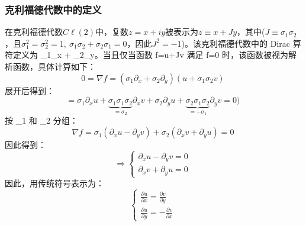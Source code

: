 \subsubsection{克利福德代数中的定义}  
在克利福德代数\({\displaystyle C\ell (2)}\)中，复数\({\displaystyle z=x+iy}\)被表示为\({\displaystyle z\equiv x+Jy}\)，其中(\({\displaystyle J\equiv \sigma_1\sigma_2}\)，且\({\displaystyle \sigma_1^2=\sigma_2^2=1,\ \sigma_1\sigma_2+\sigma_2\sigma_1=0}\)，因此\({\displaystyle J^2=-1}\))。该克利福德代数中的 Dirac 算符定义为 {\displaystyle \nabla \equiv \sigma_1\partial_x + \sigma_2\partial_y}。当且仅当函数 {\displaystyle f=u+Jv} 满足 {\displaystyle \nabla f=0} 时，该函数被视为解析函数，具体计算如下：
\[
0 = \nabla f = (\sigma_1 \partial_x + \sigma_2 \partial_y)(u + \sigma_1\sigma_2 v)~
\]
展开后得到：
\[
= \sigma_1 \partial_x u + \underbrace{\sigma_1 \sigma_1 \sigma_2}_{=\sigma_2} \partial_x v + \sigma_2 \partial_y u + \underbrace{\sigma_2 \sigma_1 \sigma_2}_{=-\sigma_1} \partial_y v = 0)~
\]
按 {\displaystyle \sigma_1} 和 {\displaystyle \sigma_2} 分组：
\[
\nabla f = \sigma_1 (\partial_x u - \partial_y v) + \sigma_2 (\partial_x v + \partial_y u) = 0~
\]
因此得到：
\[
\Rightarrow \begin{cases} \partial_x u - \partial_y v = 0 \\ \partial_x v + \partial_y u = 0 \end{cases}~
\]
因此，用传统符号表示为：
\[
\begin{cases} \frac{\partial u}{\partial x} = \frac{\partial v}{\partial y} \\ \frac{\partial u}{\partial y} = - \frac{\partial v}{\partial x} \end{cases}~
\]
